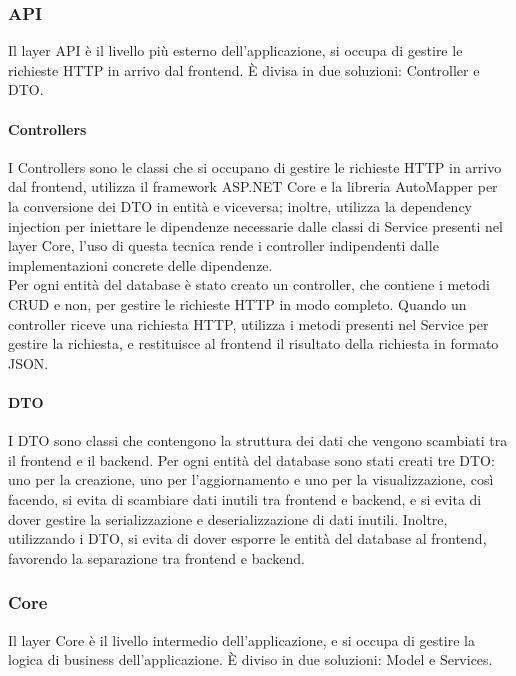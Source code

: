 \subsubsection{API}
Il layer API è il livello più esterno dell'applicazione, si occupa di gestire le richieste HTTP in arrivo dal frontend. È divisa in due soluzioni: Controller e DTO.\\
\paragraph{Controllers}
I Controllers sono le classi che si occupano di gestire le richieste HTTP in arrivo dal frontend, utilizza il framework ASP.NET Core e la libreria AutoMapper per la conversione dei DTO in entità e viceversa; inoltre, utilizza la dependency injection per iniettare le dipendenze necessarie dalle classi di Service presenti nel layer Core, l'uso di questa tecnica rende i controller indipendenti dalle implementazioni concrete delle dipendenze.\\
Per ogni entità del database è stato creato un controller, che contiene i metodi CRUD e non, per gestire le richieste HTTP in modo completo. Quando un controller riceve una richiesta HTTP, utilizza i metodi presenti nel Service per gestire la richiesta, e restituisce al frontend il risultato della richiesta in formato JSON.\\

\paragraph{DTO}
I DTO sono classi che contengono la struttura dei dati che vengono scambiati tra il frontend e il backend.
Per ogni entità del database sono stati creati tre DTO: uno per la creazione, uno per l'aggiornamento e uno per la visualizzazione, così facendo, si evita di scambiare dati inutili tra frontend e backend, e si evita di dover gestire la serializzazione e deserializzazione di dati inutili. Inoltre, utilizzando i DTO, si evita di dover esporre le entità del database al frontend, favorendo la separazione tra frontend e backend.\\

\subsubsection{Core}
Il layer Core è il livello intermedio dell'applicazione, e si occupa di gestire la logica di business dell'applicazione. È diviso in due soluzioni: Model e Services.\\

